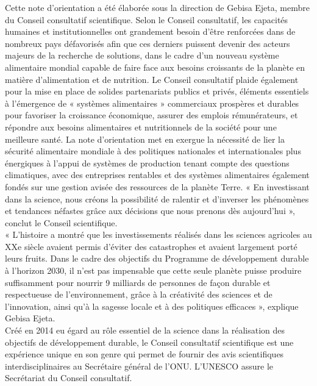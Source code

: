 \documentclass[8pt]{article}
\begin{document}
Cette note d’orientation a été élaborée sous la direction de Gebisa Ejeta, membre du Conseil consultatif scientifique. Selon le Conseil consultatif, les capacités humaines et institutionnelles ont grandement besoin d’être renforcées dans de nombreux pays défavorisés afin que ces derniers puissent devenir des acteurs majeurs de la recherche de solutions, dans le cadre d’un nouveau système alimentaire mondial capable de faire face aux besoins croissants de la planète en matière d’alimentation et de nutrition.
Le Conseil consultatif plaide également pour la mise en place de solides partenariats publics et privés, éléments essentiels à l’émergence de « systèmes alimentaires » commerciaux prospères et durables pour favoriser la croissance économique, assurer des emplois rémunérateurs, et répondre aux besoins alimentaires et nutritionnels de la société pour une meilleure santé.
La note d’orientation met en exergue la nécessité de lier la sécurité alimentaire mondiale à des politiques nationales et internationales plus énergiques à l’appui de systèmes de production tenant compte des questions climatiques, avec des entreprises rentables et des systèmes alimentaires également fondés sur une gestion avisée des ressources de la planète Terre.
« En investissant dans la science, nous créons la possibilité de ralentir et d’inverser les phénomènes et tendances néfastes grâce aux décisions que nous prenons dès aujourd’hui », conclut le Conseil scientifique.\\

« L’histoire a montré que les investissements réalisés dans les sciences agricoles au XXe siècle avaient permis d’éviter des catastrophes et avaient largement porté leurs fruits. Dans le cadre des objectifs du Programme de développement durable à l’horizon 2030, il n’est pas impensable que cette seule planète puisse produire suffisamment pour nourrir 9 milliards de personnes de façon durable et respectueuse de l’environnement, grâce à la créativité des sciences et de l’innovation, ainsi qu’à la sagesse locale et à des politiques efficaces », explique Gebisa Ejeta.\\

Créé en 2014 eu égard au rôle essentiel de la science dans la réalisation des objectifs de développement durable, le Conseil consultatif scientifique est une expérience unique en son genre qui permet de fournir des avis scientifiques interdisciplinaires au Secrétaire général de l’ONU. L’UNESCO assure le Secrétariat du Conseil consultatif.  
\end{document}

